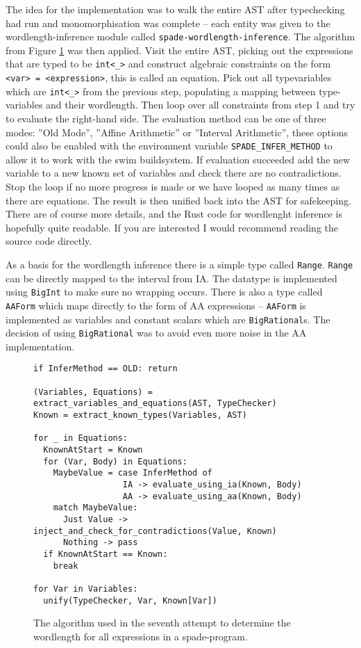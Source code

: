 The idea for the implementation was to walk the entire AST after typechecking had run and monomorphisation was complete -- each entity was given to the wordlength-inference module called \verb+spade-wordlength-inference+. The algorithm from Figure \ref{fig:WLIAlgo} was then applied. Visit the entire AST, picking out the expressions that are typed to be \verb+int<_>+ and construct algebraic constraints on the form \verb+<var> = <expression>+, this is called an equation. Pick out all typevariables which are \verb+int<_>+ from the previous step, populating a mapping between type-variables and their wordlength. Then loop over all constraints from step 1 and try to evaluate the right-hand side. The evaluation method can be one of three modes: ''Old Mode'', ''Affine Arithmetic'' or ''Interval Arithmetic'', these options could also be enabled with the environment variable \verb+SPADE_INFER_METHOD+ to allow it to work with the swim buildsystem. If evaluation succeeded add the new variable to a new known set of variables and check there are no contradictions. Stop the loop if no more progress is made or we have looped as many times as there are equations. The result is then unified back into the AST for safekeeping. There are of course more details, and the Rust code for wordlenght inference is hopefully quite readable. If you are interested I would recommend reading the source code directly. 

As a basis for the wordlength inference there is a simple type called \verb+Range+. \verb+Range+ can be directly mapped to the interval from IA. The datatype is implemented using \verb+BigInt+ to make sure no wrapping occurs. There is also a type called \verb+AAForm+ which maps directly to the form of AA expressions -- \verb+AAForm+ is implemented as variables and constant scalars which are \verb+BigRational+s. The decision of using \verb+BigRational+ was to avoid even more noise in the AA implementation.

\begin{figure}
\begin{verbatim}
if InferMethod == OLD: return

(Variables, Equations) = extract_variables_and_equations(AST, TypeChecker)
Known = extract_known_types(Variables, AST)

for _ in Equations:
  KnownAtStart = Known
  for (Var, Body) in Equations:
    MaybeValue = case InferMethod of
                  IA -> evaluate_using_ia(Known, Body)
                  AA -> evaluate_using_aa(Known, Body)
    match MaybeValue:
      Just Value -> inject_and_check_for_contradictions(Value, Known)
      Nothing -> pass
  if KnownAtStart == Known:
    break

for Var in Variables:
  unify(TypeChecker, Var, Known[Var])
\end{verbatim}
\caption{The algorithm used in the seventh attempt to determine the wordlength for all expressions in a spade-program.}
\label{fig:WLIAlgo}
\end{figure}

